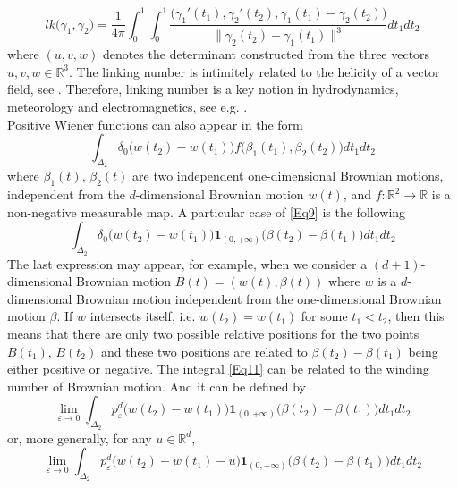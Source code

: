 \documentclass[]{interact}
\newcommand{\R}{{\mathbb{R}}}
\newcommand{\1}{\mathbf{1}}
\newcommand{\ve}{\varepsilon}
\theoremstyle{plain}%
\theoremstyle{definition}
\theoremstyle{remark}
\begin{document}
\begin{equation}
lk\big( \gamma_1,\gamma_2\big) =\dfrac{1}{4\pi} \int_0^1 \int_0^1 \dfrac{\big(\gamma_1'(t_1),\gamma_2'(t_2),\gamma_1(t_1)-\gamma_2(t_2)\big) }{\| \gamma_2(t_2)-\gamma_1(t_1)\|^3} dt_1dt_2
\end{equation}
where $(u,v,w)$ denotes the determinant constructed from the three vectors $u,v,w\in \R^3$. The linking number is intimitely related to the helicity of a vector field, see \cite[Theorem 4.4]{AK98}. Therefore, linking number is a key notion in hydrodynamics, meteorology and electromagnetics, see e.g. \cite[Chapter 1,\$ 5 ]{AK98}. \\
Positive Wiener functions can also appear in the form 
\begin{equation}\label{Eq9}
\int _{\Delta_2} \delta_0 \big(w(t_2)-w(t_1) \big) f\big( \beta_1(t_1),\beta_2(t_2)\big ) dt_1dt_2 
\end{equation}  
where $\beta_1(t),\, \beta_2(t)$ are two independent one-dimensional Brownian motions, independent from the $d$-dimensional Brownian motion $w(t)$, and $f : \R^2\to \R$ is a non-negative measurable map. A particular case of \eqref{Eq9} is the following 
\begin{equation} \label{Eq11}
 \int _{\Delta_2} \delta_0 \big(w(t_2)-w(t_1) \big) \mathbf{1}_{(0,+\infty)}\big( \beta(t_2)-\beta(t_1)\big ) dt_1dt_2
\end{equation}
The last expression may appear, for example, when we consider a $(d+1)$-dimensional Brownian motion $B(t)=(w(t),\beta(t))$ where $w$ is a $d$-dimensional Brownian motion independent from the one-dimensional Brownian motion $\beta$. If $w$ intersects itself, i.e. $w(t_2)=w(t_1)$ for some $t_1<t_2$, then this means that there are only two possible relative positions for the two points $B(t_1),\, B(t_2)$ and these two positions are related to $\beta (t_2)-\beta(t_1)$ being either positive or negative. The integral \eqref{Eq11} can be related to the winding number of Brownian motion. And it can be defined by 
\begin{equation} \label{Eq12}
 \lim_{\ve \to 0}\int _{\Delta_2}p_\ve^d \big(w(t_2)-w(t_1) \big) \mathbf{1}_{(0,+\infty)}\big( \beta(t_2)-\beta(t_1)\big ) dt_1dt_2
\end{equation}
or, more generally, for any $u\in \R^d$,
\begin{equation} \label{Eq13}
 \lim_{\ve \to 0}\int _{\Delta_2}p_\ve^d \big(w(t_2)-w(t_1)-u \big) \mathbf{1}_{(0,+\infty)}\big( \beta(t_2)-\beta(t_1)\big ) dt_1dt_2 
\end{equation}
\end{document}
